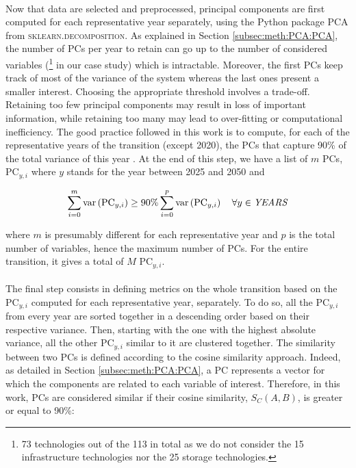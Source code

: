 \\

\noindent
Now that data are selected and preprocessed, principal components are first computed for each representative year separately, using the Python package \textsc{PCA} from \textsc{sklearn.decomposition}. As explained in Section \ref{subsec:meth:PCA:PCA}, the number of PCs per year to retain can go up to the number of considered variables (\footnote{73 technologies out of the 113 in total as we do not consider the 15 infrastructure technologies nor the 25 storage technologies.} in our case study) which is intractable. Moreover, the first PCs keep track of most of the variance of the system whereas the last ones present a smaller interest. Choosing the appropriate threshold involves a trade-off. Retaining too few principal components may result in loss of important information, while retaining too many may lead to over-fitting or computational inefficiency. The good practice followed in this work is to compute, for each of the representative years of the transition (except 2020),  the PCs that capture 90\% of the total variance of this year \cite{jolliffe2002principal}. At the end of this step, we have a list of $m$ PCs, \ie $\text{PC}_{y,i}$ where $y$ stands for the year between 2025 and 2050 and 

\begin{equation}
\label{eq:PC_year}
\sum_{i=0}^m\text{var}\left(\text{PC}_{y,i}\right)\geq 90\% \sum_{i=0}^p\text{var}\left(\text{PC}_{y,i}\right) \quad \forall y \in \text{\emph{YEARS}}
\end{equation}

\noindent
where $m$ is presumably different for each representative year and $p$ is the total number of variables, hence the maximum number of PCs. For the entire transition, it gives a total of $M$ $\text{PC}_{y,i}$.\\

\\

\noindent
The final step consists in defining metrics on the whole transition based on the $\text{PC}_{y,i}$ computed for each representative year, separately. To do so, all the $\text{PC}_{y,i}$ from every year are sorted together in a descending order based on their respective variance. Then, starting with the one with the highest absolute variance, all the other $\text{PC}_{y,i}$ similar to it are clustered together. The similarity between two PCs is defined according to the cosine similarity approach. Indeed, as detailed in Section \ref{subsec:meth:PCA:PCA}, a PC represents a vector for which the components are related to each variable of interest. Therefore, in this work, PCs are considered similar if their cosine similarity, $S_C (A,B)$, is greater or equal to 90\%:

